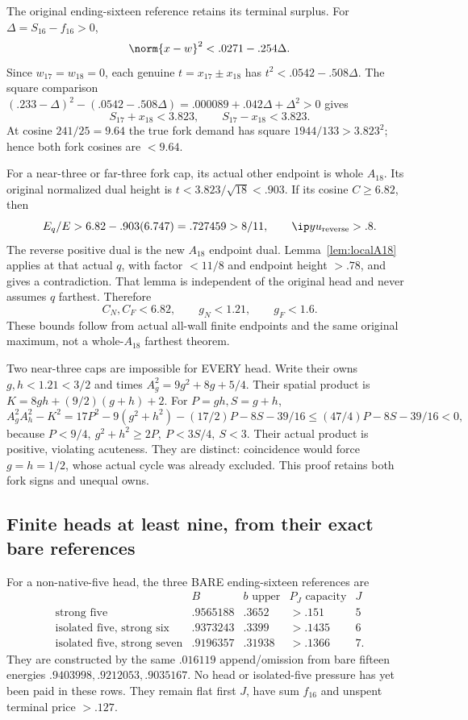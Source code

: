 The original ending-sixteen reference retains its terminal surplus.
For \(\Delta=S_{16}-f_{16}>0\),
\[
 \norm{x-w}^2<.0271-.254\Delta .
\]
Since \(w_{17}=w_{18}=0\), each genuine
\(t=x_{17}\pm x_{18}\) has \(t^2<.0542-.508\Delta\).
The square comparison
\((.233-\Delta)^2-(.0542-.508\Delta)
=.000089+.042\Delta+\Delta^2>0\)
gives
\[
 S_{17}+x_{18}<3.823,\qquad S_{17}-x_{18}<3.823.
\]
At cosine \(241/25=9.64\) the true fork demand has square
\(1944/133>3.823^2\); hence both fork cosines are \(<9.64\).

For a near-three or far-three fork cap, its actual other endpoint is
whole \(A_{18}\). Its original normalized dual height is
\(t<3.823/\sqrt{18}<.903\).
If its cosine \(C\geq6.82\), then
\[
 E_q/E>6.82-.903(6.747)=.727459>8/11,
 \qquad \ip y{u_{\rm reverse}}>.8 .
\]
The reverse positive dual is the new \(A_{18}\) endpoint dual.
Lemma~\ref{lem:localA18} applies at that actual \(q\), with factor
\(<11/8\) and endpoint height \(>.78\), and gives a contradiction.
That lemma is independent of the original head and never assumes
\(q\) farthest. Therefore
\[
 C_N,C_F<6.82,\qquad g_N<1.21,\qquad g_F<1.6 .
\]
These bounds follow from actual all-wall finite endpoints and
the same original maximum, not a whole-\(A_{18}\) farthest theorem.

Two near-three caps are impossible for EVERY head.
Write their owns \(g,h<1.21<3/2\) and times
\(A_g^2=9g^2+8g+5/4\).
Their spatial product is
\(K=8gh+(9/2)(g+h)+2\).
For \(P=gh,S=g+h\),
\[
 A_g^2A_h^2-K^2
 =17P^2-9(g^2+h^2)-(17/2)P-8S-39/16
 \leq(47/4)P-8S-39/16<0 ,
\]
because \(P<9/4,\ g^2+h^2\geq2P,\ P<3S/4,\ S<3\).
Their actual product is positive, violating acuteness.
They are distinct: coincidence would force \(g=h=1/2\),
whose actual cycle was already excluded.
This proof retains both fork signs and unequal owns.

\subsection{Finite heads at least nine, from their exact bare references}
\label{app:D18finiteheadslarge}
For a non-native-five head, the three BARE ending-sixteen references
are
\[
\begin{array}{c|c|c|c|c}
 &B&b\text{ upper}&P_J\text{ capacity}&J\\ \hline
\text{strong five}&.9565188&.3652&>.151&5\\
\text{isolated five, strong six}&.9373243&.3399&>.1435&6\\
\text{isolated five, strong seven}&.9196357&.31938&>.1366&7 .
\end{array}
\]
They are constructed by the same \(.016119\) append/omission
from bare fifteen energies
\(.9403998,.9212053,.9035167\).
No head or isolated-five pressure has yet been paid in these rows.
They remain flat first \(J\), have sum \(f_{16}\) and unspent
terminal price \(>.127\).

